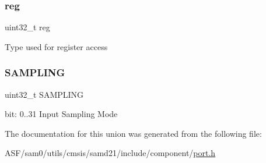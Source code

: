 \subsubsection{\texorpdfstring{reg}{reg}}
{\footnotesize\ttfamily uint32\+\_\+t reg}

Type used for register access \mbox{\label{union_p_o_r_t___c_t_r_l___type_ae2db552edfe72e233d4d623c738aea95}} 
\subsubsection{\texorpdfstring{SAMPLING}{SAMPLING}}
{\footnotesize\ttfamily uint32\+\_\+t S\+A\+M\+P\+L\+I\+NG}

bit\+: 0..31 Input Sampling Mode 

The documentation for this union was generated from the following file\+:\begin{DoxyCompactItemize}
\item 
A\+S\+F/sam0/utils/cmsis/samd21/include/component/\mbox{\hyperlink{utils_2cmsis_2samd21_2include_2component_2port_8h}{port.\+h}}\end{DoxyCompactItemize}
